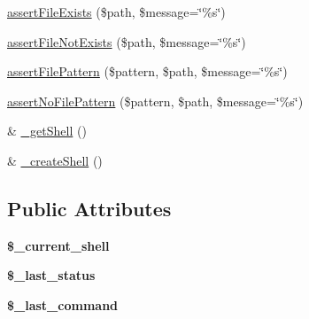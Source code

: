 \begin{DoxyCompactItemize}
\item 
\hyperlink{class_shell_test_case_a3ca9dde84e4ce935debf085d58e72aa7}{assertFileExists} (\$path, \$message=\char`\"{}\%s\char`\"{})
\item 
\hyperlink{class_shell_test_case_a7b9157f6e650db44eb308f860bf99228}{assertFileNotExists} (\$path, \$message=\char`\"{}\%s\char`\"{})
\item 
\hyperlink{class_shell_test_case_a431dc8207ce018d6d6f48f35d30e9f8e}{assertFilePattern} (\$pattern, \$path, \$message=\char`\"{}\%s\char`\"{})
\item 
\hyperlink{class_shell_test_case_a11e982abca8dcdc022aecef4866a31b1}{assertNoFilePattern} (\$pattern, \$path, \$message=\char`\"{}\%s\char`\"{})
\item 
\& \hyperlink{class_shell_test_case_a51aeeea213f51d1f4b17173fd507d782}{\_\-getShell} ()
\item 
\& \hyperlink{class_shell_test_case_a0f75705b8a86cd6dfbe7d38a040e53e4}{\_\-createShell} ()
\end{DoxyCompactItemize}
\subsection*{Public Attributes}
\begin{DoxyCompactItemize}
\item 
\hypertarget{class_shell_test_case_a6bad5777c529156205780697b5e22934}{
{\bfseries \$\_\-current\_\-shell}}
\label{class_shell_test_case_a6bad5777c529156205780697b5e22934}

\item 
\hypertarget{class_shell_test_case_ae0cb066cfc0efd2a25fcf9089cce8b27}{
{\bfseries \$\_\-last\_\-status}}
\label{class_shell_test_case_ae0cb066cfc0efd2a25fcf9089cce8b27}

\item 
\hypertarget{class_shell_test_case_a672fcd93c29f0d592af9dd7da322d30e}{
{\bfseries \$\_\-last\_\-command}}
\label{class_shell_test_case_a672fcd93c29f0d592af9dd7da322d30e}

\end{DoxyCompactItemize}


